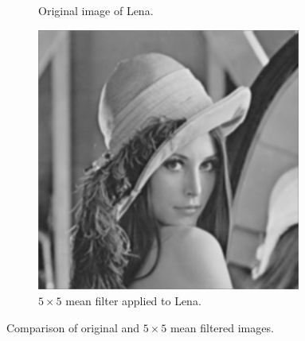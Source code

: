 \documentclass{article}
\theoremstyle{problemstyle}
\begin{document}
\begin{problem}
\begin{enumerate}[a)]
\begin{enumerate}[i)]
\begin{figure}[H]
\begin{subfigure}{.45\textwidth}
				            \caption{Original image of Lena.}
			            \end{subfigure}
			            \hfill
			            \begin{subfigure}{.45\textwidth}
				            \centering
				            \includegraphics[width=0.95\textwidth]{lena_mean_5x5.png}
				            \caption{$ 5\times 5 $ mean filter applied to Lena.}
				            \label{fig:lena_mean_5x5}
			            \end{subfigure}
			            \caption{Comparison of original and $ 5\times 5 $ mean filtered images.}
		            \end{figure}


\end{enumerate}
\end{enumerate}
\end{problem}
\end{document}
